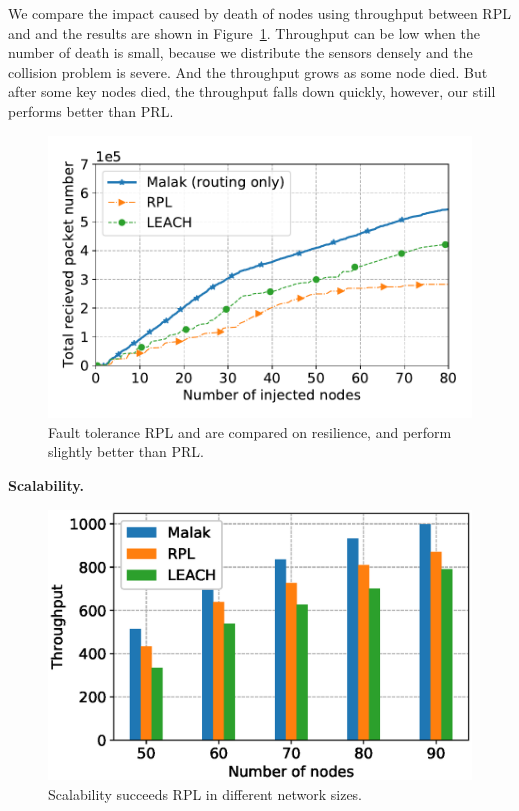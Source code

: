 We compare the impact caused by death of nodes using throughput between RPL and
{\sdn} and the results are shown in Figure~\ref{fig:fault_tolerance}. Throughput
can be low when the number of death is small, because we distribute the sensors
densely and the collision problem is severe. And the throughput grows as some
node died. But after some key nodes died, the throughput falls down quickly,
however, our {\sdn} still performs better than PRL.

\begin{figure}[htbp]
	\centering
	\includegraphics[width=.85\columnwidth]{Figure/fault_tolerance}
	\vspace{-0.1in}
	\caption{Fault tolerance
		\textnormal{
			RPL and {\sdn} are compared on resilience, and {\sdn} perform
			slightly better than PRL.
		}}
	\label{fig:fault_tolerance}
\end{figure}

\textbf{Scalability.}
\begin{figure}[htbp]
	\centering
	\includegraphics[width=.85\columnwidth]{Figure/scalability}
	\vspace{-0.1in}
	\caption{Scalability
		\textnormal{
			{\sdn} succeeds RPL in different network sizes.
		}}
	\label{fig:scalability}
\end{figure}

